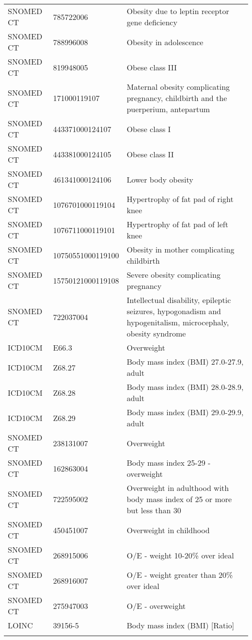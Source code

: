 \begin{longtable}{p{}p{}p{}}
  SNOMED CT & 785722006 & Obesity due to leptin receptor gene deficiency \\ 
  SNOMED CT & 788996008 & Obesity in adolescence \\ 
  SNOMED CT & 819948005 & Obese class III \\ 
  SNOMED CT & 171000119107 & Maternal obesity complicating pregnancy, childbirth and the puerperium, antepartum \\ 
  SNOMED CT & 443371000124107 & Obese class I \\ 
  SNOMED CT & 443381000124105 & Obese class II \\ 
  SNOMED CT & 461341000124106 & Lower body obesity \\ 
  SNOMED CT & 1076701000119104 & Hypertrophy of fat pad of right knee \\ 
  SNOMED CT & 1076711000119101 & Hypertrophy of fat pad of left knee \\ 
  SNOMED CT & 10750551000119100 & Obesity in mother complicating childbirth \\ 
  SNOMED CT & 15750121000119108 & Severe obesity complicating pregnancy \\ 
  SNOMED CT & 722037004 & Intellectual disability, epileptic seizures, hypogonadism and hypogenitalism, microcephaly, obesity syndrome \\ 
  ICD10CM & E66.3 & Overweight \\ 
  ICD10CM & Z68.27 & Body mass index (BMI) 27.0-27.9, adult \\ 
  ICD10CM & Z68.28 & Body mass index (BMI) 28.0-28.9, adult \\ 
  ICD10CM & Z68.29 & Body mass index (BMI) 29.0-29.9, adult \\ 
  SNOMED CT & 238131007 & Overweight \\ 
  SNOMED CT & 162863004 & Body mass index 25-29 - overweight \\ 
  SNOMED CT & 722595002 & Overweight in adulthood with body mass index of 25 or more but less than 30 \\ 
  SNOMED CT & 450451007 & Overweight in childhood \\ 
  SNOMED CT & 268915006 & O/E - weight 10-20\% over ideal \\ 
  SNOMED CT & 268916007 & O/E - weight greater than 20\% over ideal \\ 
  SNOMED CT & 275947003 & O/E - overweight \\ 
  LOINC & 39156-5 & Body mass index (BMI) [Ratio] \\ 
  \hline
\label{tab:codes_overweightobesity}
\end{longtable}
